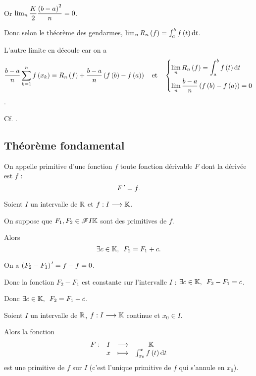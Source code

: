 \begin{dem}
Or \(\lim_n\dfrac{K}{2}\dfrac{\left(b-a\right)^2}{n}=0\).

Donc selon le \hyperref[theo:gendarmes]{théorème des gendarmes}, \(\lim_nR_n\paren{f}=\int_a^bf\paren{t}\odif{t}\).

L'autre limite en découle car on a \[\dfrac{b-a}{n}\sum_{k=1}^{n}f\paren{x_k}=R_n\paren{f}+\dfrac{b-a}{n}\paren{f\paren{b}-f\paren{a}}\quad\text{et}\quad\begin{dcases}\lim_nR_n\paren{f}=\int_a^bf\paren{t}\odif{t} \\ \lim_n\dfrac{b-a}{n}\paren{f\paren{b}-f\paren{a}}=0\end{dcases}\].
\end{dem}

\begin{dem}
Cf. .
\end{dem}

\subsection{Théorème fondamental}

\begin{defi}
On appelle primitive d'une fonction \(f\) toute fonction dérivable \(F\) dont la dérivée est \(f\) : \[F^{\,\prime}=f.\]
\end{defi}

\begin{prop}
Soient \(I\) un intervalle de \(\mathbb{R}\) et \(f:I\longrightarrow\mathbb{K}\).

On suppose que \(F_1,F_2\in\mathscr{F}{I}{\mathbb{K}}\) sont des primitives de \(f\).

Alors \[\quantifs{\exists c\in\K}F_2=F_1+c.\]
\end{prop}

\begin{dem}
On a \(\left(F_2-F_1\right)^{\,\prime}=f-f=0\).

Donc la fonction \(F_2-F_1\) est constante sur l'intervalle \(I\) : \(\quantifs{\exists c\in\K}F_2-F_1=c\).

Donc \(\quantifs{\exists c\in\K}F_2=F_1+c\).
\end{dem}

\begin{theo}
Soient \(I\) un intervalle de \(\mathbb{R}\), \(f:I\longrightarrow\mathbb{K}\) continue et \(x_0\in I\).

Alors la fonction \[\fonction{F}{I}{\K}{x}{\int_{x_0}^xf\paren{t}\odif{t}}\] est une primitive de \(f\) sur \(I\) (c'est l'unique primitive de \(f\) qui s'annule en \(x_0\)).
\end{theo}

